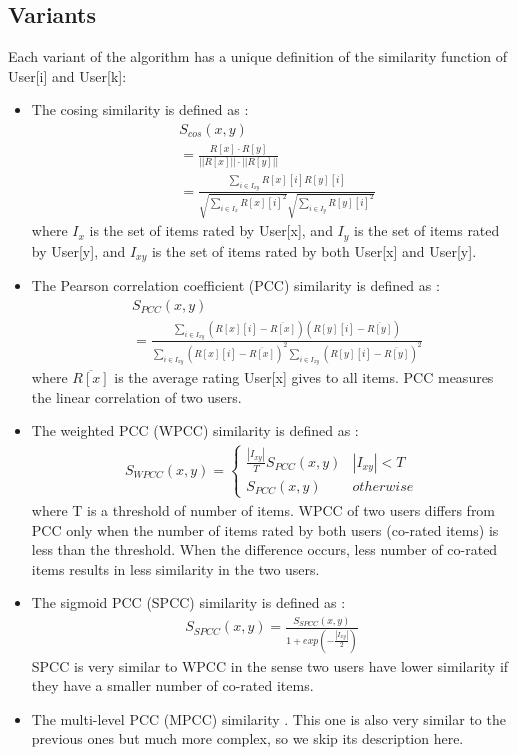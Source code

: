 \documentclass[twocolumn]{article}
\begin{document}
\subsection{Variants}
Each variant of the algorithm has a unique definition of the similarity 
function of User[i] and User[k]:
\begin{itemize}
	\item The cosing similarity is defined as \cite{sarwar2000analysis}:
	\begin{align*}
		&S_{cos}(x, y) \\
		&= \frac{R[x] \cdot R[y]}{||R[x]|| \cdot ||R[y]||} \\
		&= \frac{\sum_{i \in I_{xy}}R[x][i]R[y][i]}{\sqrt{\sum_{i \in 
		I_x}R[x][i]^2} \sqrt{\sum_{i \in I_y}R[y][i]^2}}
	\end{align*}
	where $ I_{x} $ is the set of items rated by User[x],
	and $ I_{y} $ is the set of items rated by User[y], 
	and $ I_{xy} $ is the set of items rated by both User[x] and User[y]. 
	\item The Pearson correlation coefficient (PCC) similarity is defined as 
	\cite{resnick1994grouplens}:
	\begin{align*}
		&S_{PCC}(x, y) \\
		&= \frac{\sum_{i \in I_{xy}}(R[x][i] - \overline{R[x]})(R[y][i] - 
		\overline{R[y]})}{\sum_{i \in I_{xy}}(R[x][i] - \overline{R[x]})^2 
		\sum_{i 
		\in I_{xy}}(R[y][i] - \overline{R[y]})^2 }
	\end{align*}
	where $ \overline{R[x]} $ is the average rating User[x] gives to all items.
	PCC measures the linear correlation of two users.
	\item The weighted PCC (WPCC) similarity is defined as 
	\cite{herlocker1999algorithmic}:
	\begin{align*}
		S_{WPCC}(x, y) = 
		\begin{cases}
			\frac{|I_{xy}|}{T} S_{PCC}(x, y) & |I_{xy}| < T \\
			S_{PCC}(x, y) & otherwise
		\end{cases}
	\end{align*}
	where T is a threshold of number of items. 
	WPCC of two users differs from PCC only when the number of items rated by 
	both users (co-rated items) is less than the threshold. 
	When the difference occurs, less number of co-rated items results in less 
	similarity in the two users.
	\item The sigmoid PCC (SPCC) similarity is defined as 
	\cite{jamali2009trustwalker}:
	\begin{align*}
		S_{SPCC} (x, y) = \frac{S_{SPCC}(x, y)}{1 + exp(-\frac{|I_{xy}|}{2})}
	\end{align*}
	SPCC is very similar to WPCC in the sense two users have lower similarity 
	if they have a smaller number of co-rated items.
	\item The multi-level PCC (MPCC) similarity \cite{polatidis2016multi} . 
	This one is also very similar to the previous ones but much more complex, 
	so we skip its description here.
\end{itemize}
\end{document}

